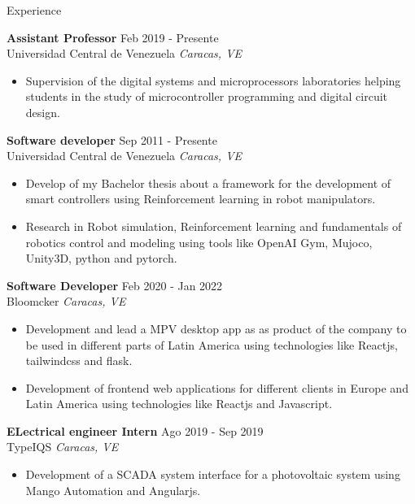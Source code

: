 \documentclass{resume} %
\begin{document}
\begin{rSection}{Experience} %

    \textbf{Assistant Professor} \hfill Feb 2019 - Presente\\
    Universidad Central de Venezuela \hfill \textit{Caracas, VE}
    \begin{itemize}
        \item Supervision of the digital systems and microprocessors laboratories helping students in the study of microcontroller programming and digital circuit design.

    \end{itemize}

    \textbf{Software developer} \hfill Sep 2011 - Presente\\
    Universidad Central de Venezuela \hfill \textit{Caracas, VE}
    \begin{itemize}

        \item Develop of my Bachelor thesis about a framework for the development of smart controllers using Reinforcement learning in robot manipulators.

        \item Research in Robot simulation, Reinforcement learning and fundamentals of robotics control and modeling using tools like OpenAI Gym, Mujoco, Unity3D, python and pytorch.

    \end{itemize}

    \textbf{Software Developer} \hfill Feb 2020 - Jan 2022\\
    Bloomcker \hfill \textit{Caracas, VE}
    \begin{itemize}

        \item Development and lead a MPV desktop app as as product of the company to be used in different parts of Latin America using technologies like Reactjs, tailwindcss and flask.

        \item Development of frontend web applications for different clients in Europe and Latin America using technologies like Reactjs and Javascript.

    \end{itemize}


    \textbf{ELectrical engineer Intern} \hfill Ago 2019 - Sep 2019\\
    TypeIQS \hfill \textit{Caracas, VE}
    \begin{itemize}
        \item Development of a SCADA system interface for a photovoltaic system using Mango Automation and Angularjs.


\end{itemize}
\end{rSection}
\end{document}
